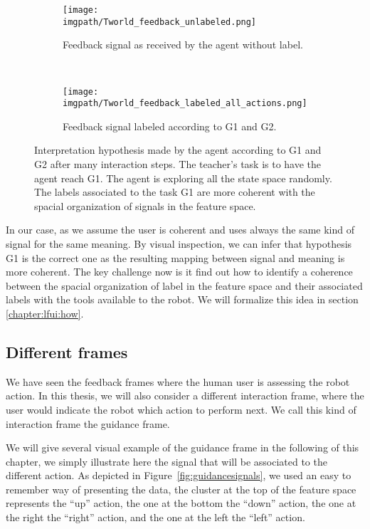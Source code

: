 \begin{figure}[!ht]
    \centering
    \begin{subfigure}[t]{\tworldsize\columnwidth}
        \centering
        \texttt{[image: \\imgpath/Tworld\_feedback\_unlabeled.png]}
        \caption{Feedback signal as received by the agent without label.}
    \end{subfigure}\\
    \begin{subfigure}[b]{\columnwidth}
        \centering
        \texttt{[image: \\imgpath/Tworld\_feedback\_labeled\_all\_actions.png]}
        \caption{Feedback signal labeled according to G1 and G2.}
        \label{fig:TworldLabelinterpretation}
    \end{subfigure}
    \caption{Interpretation hypothesis made by the agent according to G1 and G2 after many interaction steps. The teacher's task is to have the agent reach G1. The agent is exploring all the state space randomly. The labels associated to the task G1 are more coherent with the spacial organization of signals in the feature space.}
    \label{fig:TworldLabel}
\end{figure}

In our case, as we assume the user is coherent and uses always the same kind of signal for the same meaning. By visual inspection, we can infer that hypothesis G1 is the correct one as the resulting mapping between signal and meaning is more coherent. The key challenge now is it find out how to identify a coherence between the spacial organization of label in the feature space and their associated labels with the tools available to the robot. We will formalize this idea in section \ref{chapter:lfui:how}. 

\subsection{Different frames}

We have seen the feedback frames where the human user is assessing the robot action. In this thesis, we will also consider a different interaction frame, where the user would indicate the robot which action to perform next. We call this kind of interaction frame the guidance frame.

We will give several visual example of the guidance frame in the following of this chapter, we simply illustrate here the signal that will be associated to the different action. As depicted in Figure~\ref{fig:guidancesignals}, we used an easy to remember way of presenting the data, the cluster at the top of the feature space represents the ``up'' action, the one at the bottom the ``down'' action, the one at the right the ``right'' action, and the one at the left the ``left'' action.

